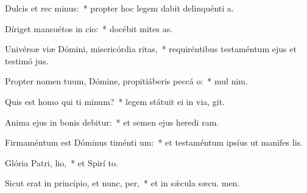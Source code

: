 \item Dulcis et rec minus:~* propter hoc legem dabit delinquénti  a.
\item Díriget mansuétos in cio:~* docébit mites  as.
\item Univérsæ viæ Dómini, misericórdia  ritas,~* requiréntibus testaméntum ejus et testimó jus.
\item Propter nomen tuum, Dómine, propitiáberis peccá o:~* mul  nim.
\item Quis est homo qui ti minum?~* legem státuit ei in via,  git.
\item Anima ejus in bonis debitur:~* et semen ejus heredi ram.
\item Firmaméntum est Dóminus timénti um:~* et testaméntum ipsíus ut manifes lis.
\item Glória Patri,  lio,~* et Spirí to.
\item Sicut erat in princípio, et nunc,  per,~* et in sǽcula sæcu. men.
